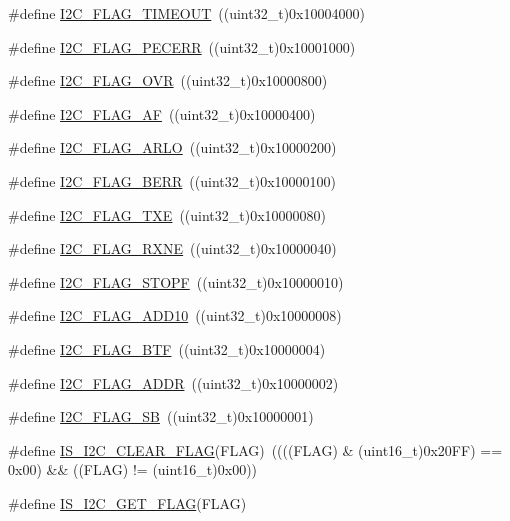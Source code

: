 \begin{DoxyCompactItemize}
\#define \mbox{\hyperlink{group___i2_c__flags__definition_ga89c8d5d8ccc77a8619fafe9b39d1cc74}{I2\+C\+\_\+\+F\+L\+A\+G\+\_\+\+T\+I\+M\+E\+O\+UT}}~((uint32\+\_\+t)0x10004000)
\item 
\#define \mbox{\hyperlink{group___i2_c__flags__definition_ga6c7addb6413f165f42bcc87506ea8467}{I2\+C\+\_\+\+F\+L\+A\+G\+\_\+\+P\+E\+C\+E\+RR}}~((uint32\+\_\+t)0x10001000)
\item 
\#define \mbox{\hyperlink{group___i2_c__flags__definition_gab579673c8ac920db199aa7f18e547fb3}{I2\+C\+\_\+\+F\+L\+A\+G\+\_\+\+O\+VR}}~((uint32\+\_\+t)0x10000800)
\item 
\#define \mbox{\hyperlink{group___i2_c__flags__definition_ga2f89dbba9b964e6ade1480705e7a97d4}{I2\+C\+\_\+\+F\+L\+A\+G\+\_\+\+AF}}~((uint32\+\_\+t)0x10000400)
\item 
\#define \mbox{\hyperlink{group___i2_c__flags__definition_gae1e67936f4780e42b8bbe04ac9c20a7b}{I2\+C\+\_\+\+F\+L\+A\+G\+\_\+\+A\+R\+LO}}~((uint32\+\_\+t)0x10000200)
\item 
\#define \mbox{\hyperlink{group___i2_c__flags__definition_ga0454176b6ddd5c402abc3ef5953a21ad}{I2\+C\+\_\+\+F\+L\+A\+G\+\_\+\+B\+E\+RR}}~((uint32\+\_\+t)0x10000100)
\item 
\#define \mbox{\hyperlink{group___i2_c__flags__definition_gaeda14a3e9d02ff20a0d001bba9328f3d}{I2\+C\+\_\+\+F\+L\+A\+G\+\_\+\+T\+XE}}~((uint32\+\_\+t)0x10000080)
\item 
\#define \mbox{\hyperlink{group___i2_c__flags__definition_gad53c5b70a186f699f187c7a641ab0dac}{I2\+C\+\_\+\+F\+L\+A\+G\+\_\+\+R\+X\+NE}}~((uint32\+\_\+t)0x10000040)
\item 
\#define \mbox{\hyperlink{group___i2_c__flags__definition_gacc7d993963e199a6ddba391dab8da896}{I2\+C\+\_\+\+F\+L\+A\+G\+\_\+\+S\+T\+O\+PF}}~((uint32\+\_\+t)0x10000010)
\item 
\#define \mbox{\hyperlink{group___i2_c__flags__definition_ga316c78cbf34b74da96d69f702a0d1444}{I2\+C\+\_\+\+F\+L\+A\+G\+\_\+\+A\+D\+D10}}~((uint32\+\_\+t)0x10000008)
\item 
\#define \mbox{\hyperlink{group___i2_c__flags__definition_ga4dc3d44342007a5cd21c3baa0d938606}{I2\+C\+\_\+\+F\+L\+A\+G\+\_\+\+B\+TF}}~((uint32\+\_\+t)0x10000004)
\item 
\#define \mbox{\hyperlink{group___i2_c__flags__definition_ga5472d1196e934e0cc471aba8f66af416}{I2\+C\+\_\+\+F\+L\+A\+G\+\_\+\+A\+D\+DR}}~((uint32\+\_\+t)0x10000002)
\item 
\#define \mbox{\hyperlink{group___i2_c__flags__definition_gae009ab84be03fcc438625b1c39376ad4}{I2\+C\+\_\+\+F\+L\+A\+G\+\_\+\+SB}}~((uint32\+\_\+t)0x10000001)
\item 
\#define \mbox{\hyperlink{group___i2_c__flags__definition_ga66c8180841350c47627c323acfe42ee9}{I\+S\+\_\+\+I2\+C\+\_\+\+C\+L\+E\+A\+R\+\_\+\+F\+L\+AG}}(F\+L\+AG)~((((F\+L\+AG) \& (uint16\+\_\+t)0x20\+F\+F) == 0x00) \&\& ((\+F\+L\+A\+G) != (uint16\+\_\+t)0x00))
\item 
\#define \mbox{\hyperlink{group___i2_c__flags__definition_ga1a2c2a7c50cd8e33e532918106b4f6ce}{I\+S\+\_\+\+I2\+C\+\_\+\+G\+E\+T\+\_\+\+F\+L\+AG}}(F\+L\+AG)
\end{DoxyCompactItemize}


